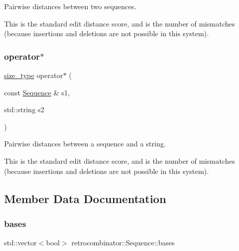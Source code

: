 Pairwise distances between two sequences. 

This is the standard edit distance score, and is the number of mismatches (because insertions and deletions are not possible in this system). \mbox{\label{classretrocombinator_1_1Sequence_afdd1af7009804b182798c40d25bb1bb5}} 
\subsubsection{\texorpdfstring{operator$\ast$}{operator*}\hspace{0.1cm}{\footnotesize\ttfamily [2/2]}}
{\footnotesize\ttfamily \hyperlink{namespaceretrocombinator_a8e1541b50cee66a791df4c437ccbb385}{size\+\_\+type} operator$\ast$ (\begin{DoxyParamCaption}\item[{const \hyperlink{classretrocombinator_1_1Sequence}{Sequence} \&}]{s1,  }\item[{std\+::string}]{s2 }\end{DoxyParamCaption})\hspace{0.3cm}{\ttfamily [friend]}}



Pairwise distances between a sequence and a string. 

This is the standard edit distance score, and is the number of mismatches (because insertions and deletions are not possible in this system). 

\subsection{Member Data Documentation}
\mbox{\label{classretrocombinator_1_1Sequence_a7c6072eaff9990a0bcaebcfa6287e3e0}} 
\subsubsection{\texorpdfstring{bases}{bases}}
{\footnotesize\ttfamily std\+::vector$<$bool$>$ retrocombinator\+::\+Sequence\+::bases\hspace{0.3cm}{\ttfamily [private]}}



